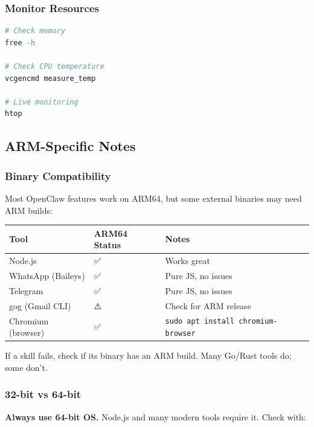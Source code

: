 \subsubsection{Monitor Resources}


\begin{lstlisting}[language=bash]
# Check memory
free -h

# Check CPU temperature
vcgencmd measure_temp

# Live monitoring
htop
\end{lstlisting}


\hrulefill


\subsection{ARM-Specific Notes}


\subsubsection{Binary Compatibility}


Most OpenClaw features work on ARM64, but some external binaries may need ARM builds:


\begin{table}[h]
\centering
\small
\begin{tabular}{|l|l|l|}
\hline
Tool & ARM64 Status & Notes \\
\hline
Node.js & ✅ & Works great \\
\hline
WhatsApp (Baileys) & ✅ & Pure JS, no issues \\
\hline
Telegram & ✅ & Pure JS, no issues \\
\hline
gog (Gmail CLI) & ⚠️ & Check for ARM release \\
\hline
Chromium (browser) & ✅ & \texttt{sudo apt install chromium-browser} \\
\hline
\end{tabular}
\end{table}



If a skill fails, check if its binary has an ARM build. Many Go/Rust tools do; some don't.

\subsubsection{32-bit vs 64-bit}


\textbf{Always use 64-bit OS.} Node.js and many modern tools require it. Check with:

